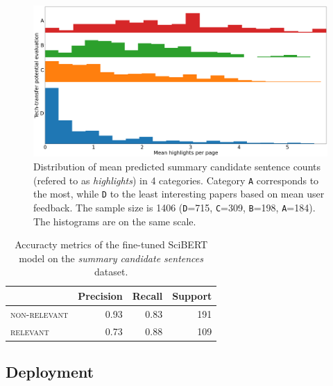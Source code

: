 \begin{figure}
    \centering
    \includegraphics[width=0.85\linewidth]{figures/highlights-histograms.png}
    \captionsetup{width=.9\linewidth}
    \caption{Distribution of mean predicted summary candidate sentence counts (refered to as \textit{highlights}) in 4 categories. Category \texttt{A} corresponds to the most, while \texttt{D} to the least interesting papers based on mean user feedback. The sample size is 1406 (\texttt{D}=715, \texttt{C}=309, \texttt{B}=198, \texttt{A}=184). The histograms are on the same scale.}
    \label{fig:histograms}
\end{figure}

\begin{table}[H]
    \centering
    \begin{threeparttable}
    \caption{Accuracty metrics of the fine-tuned SciBERT model on the \textit{summary candidate sentences} dataset.}
    \label{table:scibert-pr}
    \setlength{\tabcolsep}{0.75em} %
    {\renewcommand{\arraystretch}{1.2} %
    \begin{tabular}{|l|r|r|r|}
    \hline
    {}                    & \textbf{Precision}  & \textbf{Recall}  & \textbf{Support} \\\hline
    \textsc{non-relevant} &      0.93           &     0.83         &      191         \\\hline
    \textsc{relevant}     &      0.73           &     0.88         &      109         \\\hline
    \end{tabular}}
    \end{threeparttable}
\end{table}

\subsection{Deployment}

